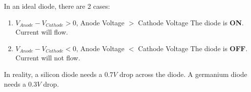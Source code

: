 \documentclass[10pt,letterpaper,final,twoside,notitlepage]{article}
\begin{document}
	In an ideal diode, there are 2 cases:
	\begin{enumerate}
		\item $V_{Anode}-V_{Cathode}>0$, Anode Voltage $>$ Cathode Voltage \newline
			The diode is \textbf{ON}. Current will flow.
		\item $V_{Anode}-V_{Cathode}<0$, Anode Voltage $<$ Cathode Voltage \newline
			The diode is \textbf{OFF}. Current will not flow.
	\end{enumerate}
	
	In reality, a silicon diode needs a $0.7V$ drop across the diode. A germanium diode needs a $0.3V$ drop. 
\end{document}
